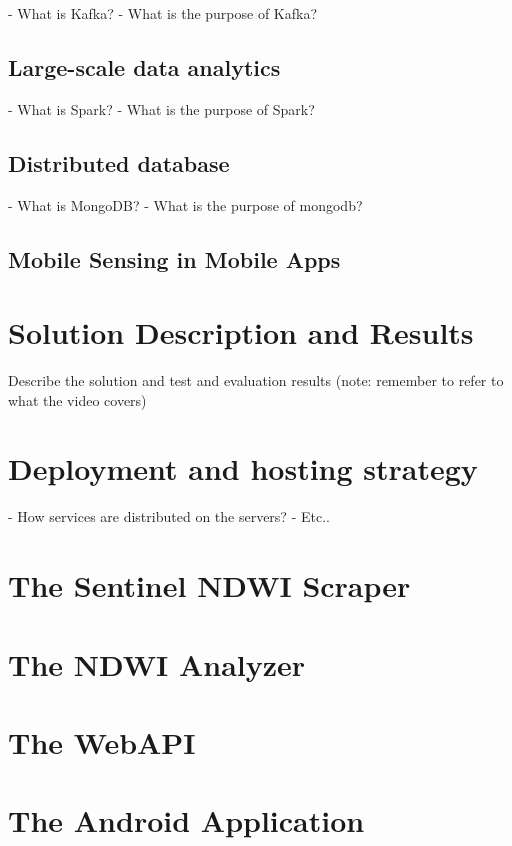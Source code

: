 - What is Kafka?
- What is the purpose of Kafka?

\subsection{Large-scale data analytics}

- What is Spark?
- What is the purpose of Spark?

\subsection{Distributed database}

- What is MongoDB?
- What is the purpose of mongodb?

\subsection{Mobile Sensing in Mobile Apps}

\section{Solution Description and Results} 
Describe the solution and test and evaluation results (note: remember to refer to what the video covers)

\section{Deployment and hosting strategy}

- How services are distributed on the servers?
- Etc..

\section{The Sentinel NDWI Scraper}

\section{The NDWI Analyzer}

\section{The WebAPI}

\section{The Android Application}
